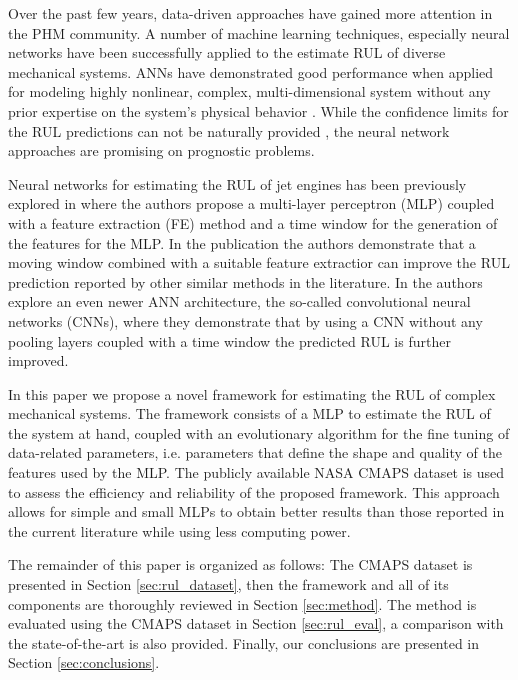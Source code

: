 \documentclass{article}
\begin{document}
Over the past few years, data-driven approaches have gained more attention in the PHM community. A number of machine learning techniques, especially neural networks have been successfully applied to the estimate RUL of diverse mechanical systems. ANNs have demonstrated good performance when applied for modeling highly nonlinear, complex, multi-dimensional system without any prior expertise on the system's physical behavior \cite{Li2018}. While the confidence limits for the RUL predictions can not be naturally provided \cite{Sikorska2011}, the neural network approaches are promising on prognostic problems.

Neural networks for estimating the RUL of jet engines has been previously explored in \cite{Lim2016} where the authors propose a multi-layer perceptron (MLP) coupled with a feature extraction (FE) method and a time window for the generation of the features for the MLP. In the publication the authors demonstrate that a moving window combined with a suitable feature extractior can improve the RUL prediction reported by other similar methods in the literature. In \cite{Li2018} the authors explore an even newer ANN architecture, the so-called convolutional neural networks (CNNs), where they demonstrate that by using a CNN without any pooling layers coupled with a time window the predicted RUL is further improved.

In this paper we propose a novel framework for estimating the RUL of complex mechanical systems. The framework consists of a MLP to estimate the RUL of the system at hand, coupled with an evolutionary algorithm for the fine tuning of data-related parameters, i.e. parameters that define the shape and quality of the features used by the MLP. The publicly available NASA CMAPS dataset \cite{CMAPS2008} is used to assess the efficiency and reliability of the proposed framework. This approach allows for simple and small MLPs to obtain better results than those reported in the current literature while using less computing power. 

The remainder of this paper is organized as follows: The CMAPS dataset is presented in Section \ref{sec:rul_dataset}, then the framework and all of its components are thoroughly reviewed in Section \ref{sec:method}. The method is evaluated using the CMAPS dataset in Section \ref{sec:rul_eval}, a comparison with the state-of-the-art is also provided. Finally, our conclusions are presented in Section \ref{sec:conclusions}.

\end{document}

